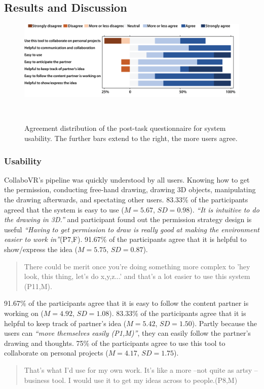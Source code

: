 \documentclass{sigchi}
\begin{document}
\subsection{Results and Discussion} 
\begin{figure}[tb!]
 \centering
 \includegraphics[width=0.98\columnwidth]{usability.png}
 \caption{Agreement distribution of the post-task questionnaire for system usability. The further bars extend to the right, the more users agree.
 }~\label{fig:usability}
\end{figure}
\subsubsection{Usability}
CollaboVR's pipeline was quickly understood by all users. Knowing how to get the permission, conducting free-hand drawing, drawing 3D objects, manipulating the drawing afterwards, and spectating other users. 83.33\% of the participants agreed that the system is easy to use ($M=5.67$, $SD=0.98$). \textit{``It is intuitive to do the drawing in 3D.''} and participant found out the permission strategy design is useful \textit{``Having to get permission to draw is really good at making the environment easier to work in''}(P7,F).
91.67\% of the participants agree that it is helpful to show/express the idea ($M=5.75$, $SD=0.87$). 
\begin{quote}
    There could be merit once you're doing something more complex to 'hey look, this thing, let's do x,y,z...' and that's a lot easier to use this system (P11,M).    
\end{quote}
91.67\% of the participants agree that it is easy to follow the content partner is working on ($M=4.92$, $SD=1.08$).
83.33\% of the participants agree that it is helpful to keep track of partner's idea ($M=5.42$, $SD=1.50$). Partly because the users can \textit{``move themselves easily (P1,M)''}, they can easily follow the partner's drawing and thoughts.
75\% of the participants agree to use this tool to collaborate on personal projects ($M=4.17$, $SD=1.75$). 
\begin{quote}
    That's what I'd use for my own work. It's like a more --not quite as artsy -- business tool. I would use it to get my ideas across to people.(P8,M)
\end{quote}
\end{document}
